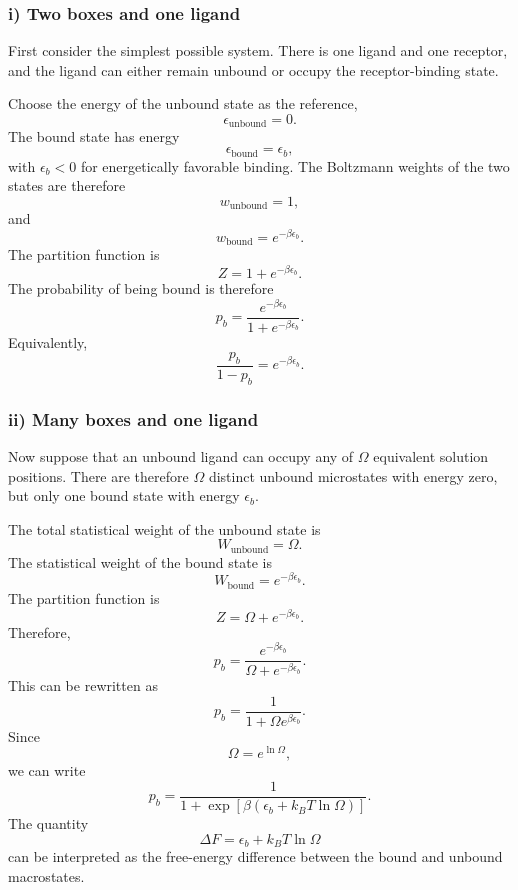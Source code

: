 \subsubsection*{i) Two boxes and one ligand}

First consider the simplest possible system.
There is one ligand and one receptor, and the ligand can either remain unbound or occupy the receptor-binding state.

Choose the energy of the unbound state as the reference,
\[
    \epsilon_{\mathrm{unbound}}=0.
\]
The bound state has energy
\[
    \epsilon_{\mathrm{bound}}=\epsilon_b,
\]
with $\epsilon_b<0$ for energetically favorable binding.
The Boltzmann weights of the two states are therefore
\[
    w_{\mathrm{unbound}}=1,
\]
and
\[
    w_{\mathrm{bound}}=e^{-\beta\epsilon_b}.
\]
The partition function is
\[
    Z=1+e^{-\beta\epsilon_b}.
\]
The probability of being bound is therefore
\[
    p_b=\frac{e^{-\beta\epsilon_b}}{1+e^{-\beta\epsilon_b}}.
\]
Equivalently,
\[
    \frac{p_b}{1-p_b}=e^{-\beta\epsilon_b}.
\]


\subsubsection*{ii) Many boxes and one ligand}

Now suppose that an unbound ligand can occupy any of $\Omega$ equivalent solution positions.
There are therefore $\Omega$ distinct unbound microstates with energy zero, but only one bound state with energy $\epsilon_b$.

The total statistical weight of the unbound state is
\[
    W_{\mathrm{unbound}}=\Omega.
\]
The statistical weight of the bound state is
\[
    W_{\mathrm{bound}}=e^{-\beta\epsilon_b}.
\]
The partition function is
\[
    Z=\Omega+e^{-\beta\epsilon_b}.
\]
Therefore,
\[
    p_b=\frac{e^{-\beta\epsilon_b}}{\Omega+e^{-\beta\epsilon_b}}.
\]
This can be rewritten as
\[
    p_b=\frac{1}{1+\Omega e^{\beta\epsilon_b}}.
\]
Since
\[
    \Omega=e^{\ln\Omega},
\]
we can write
\[
    p_b=\frac{1}{1+\exp\left[\beta\left(\epsilon_b+k_BT\ln\Omega\right)\right]}.
\]
The quantity
\[
    \Delta F=\epsilon_b+k_BT\ln\Omega
\]
can be interpreted as the free-energy difference between the bound and unbound macrostates.

